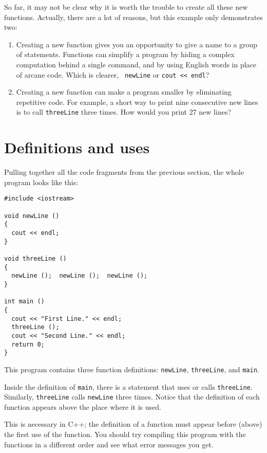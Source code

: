 So far, it may not be clear why it is worth the trouble to
create all these new functions.  Actually, there are a lot
of reasons, but this example only demonstrates two:

\begin{enumerate}

\item Creating a new function gives you an opportunity to
give a name to a group of statements.  Functions can simplify a program
by hiding a complex computation behind a single command, and by using
English words in place of arcane code.  Which is clearer, {\tt
newLine} or {\tt cout << endl}?

\item Creating a new function can make a program smaller by eliminating
repetitive code.  For example, a short way to print nine consecutive
new lines is to call {\tt threeLine} three times.  How would you
print 27 new lines?

\end{enumerate}

\section {Definitions and uses}

Pulling together all the code fragments from the previous
section, the whole program looks like this:

\begin{lstlisting}
#include <iostream>

void newLine ()
{
  cout << endl;
}

void threeLine ()
{
  newLine ();  newLine ();  newLine ();
}

int main ()
{
  cout << "First Line." << endl;
  threeLine ();
  cout << "Second Line." << endl;
  return 0;
}
\end{lstlisting}

This program contains three function definitions: {\tt newLine},
{\tt threeLine}, and {\tt main}.

Inside the definition of {\tt main}, there is a statement that
uses or calls {\tt threeLine}.  Similarly, {\tt threeLine} calls
{\tt newLine} three times.  Notice that the definition of each
function appears above the place where it is used.

This is necessary in C++; the definition of a function must
appear before (above) the first use of the function.  You
should try compiling this program with the functions in a
different order and see what error messages you get.

